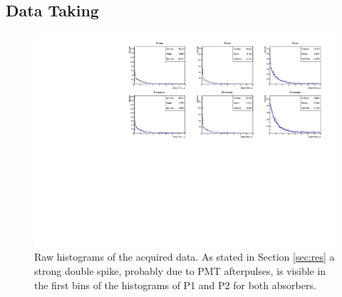 \documentclass[../main.tex]{subfiles}
\begin{document}
        \FloatBarrier
        \begin{table}[ht]
            \centering
            \caption{Measured plane efficiencies}
            \label{tab:efficiencies}
        \end{table}
    \FloatBarrier
\subsection{Data Taking}
    \begin{figure}[htb!]
        \centering
        \includegraphics[width=\linewidth]{images/histograms.pdf}
        \caption{Raw histograms of the acquired data. As stated in Section \ref{sec:res} a strong double spike, probably due to PMT afterpulses, is visible in the first bins of the histograms of P1 and P2 for both absorbers.}
        \label{fig:rawHisto}
    \end{figure}
\FloatBarrier
\end{document}
